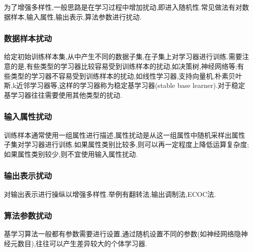 为了增强多样性,一般思路是在学习过程中增加扰动,即进入随机性.常见做法有对数据样本,输入属性,输出表示,算法参数进行扰动.

\subsubsection*{数据样本扰动}

给定初始训练样本集,从中产生不同的数据子集,在子集上对学习器进行训练.需要注意的是,有些类型的学习器比较容易受到训练样本的扰动,如决策树,神经网络等;有些类型的学习器不容易受到训练样本的扰动,如线性学习器,支持向量机,朴素贝叶斯,k近邻学习器等,这样的学习器称为稳定基学习器(stable base learner).对于稳定基学习器往往需要使用其他类型的扰动.

\subsubsection*{输入属性扰动}

训练样本通常使用一组属性进行描述,属性扰动是从这一组属性中随机采样出属性子集对学习器进行训练.如果属性类别比较多,则可以再一定程度上降低运算复杂度;如果属性类别较少,则不宜使用输入属性扰动.

\subsubsection*{输出表示扰动}

对输出表示进行操纵以增强多样性.举例有翻转法,输出调制法,ECOC法.

\subsubsection*{算法参数扰动}

基学习算法一般都有参数需要进行设置,通过随机设置不同的参数(如神经网络隐神经元数目),往往可以产生差异较大的个体学习器.
